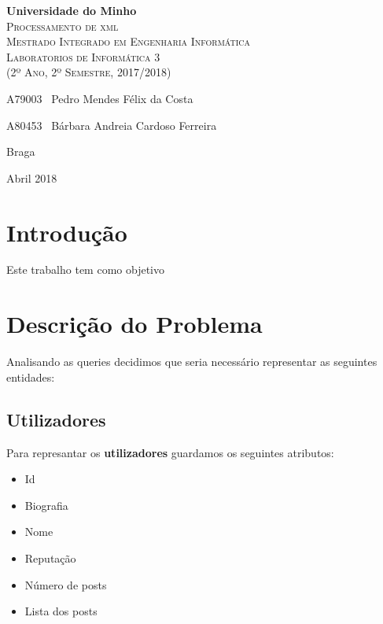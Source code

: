 \documentclass[10pt,a4paper]{report}
\begin{document}
\begin{titlepage}
    \center
    \vspace*{4.0cm}
    {\huge {\bf Universidade do Minho}}\\[0.4cm]
    \vspace{3.0cm}
    \textsc{\huge{Processamento de xml}}\\[0.5cm] %
    \vspace{3.0cm}
    \textsc{\huge{Mestrado Integrado em Engenharia Informática}}\\[0.5cm]
    \vspace{2.0cm}
    \textsc{Laboratorios de Informática 3}\\[0.5cm]
    \textsc{(2º Ano, 2º Semestre, 2017/2018)}\\[0.5cm]
    \vspace{1.5cm}
    \begin{flushleft}
        A79003 \,\,\,Pedro Mendes Félix da Costa
        \vspace{0.2cm}

        A80453 \,\,\,Bárbara Andreia Cardoso Ferreira
    \end{flushleft}
        \vspace{1cm}
    \begin{flushright}
        Braga

        Abril 2018
    \end{flushright}

\end{titlepage}

\tableofcontents

\chapter{Introdução}
    Este trabalho tem como objetivo 

\chapter{Descrição do Problema}
    Analisando as queries decidimos que seria necessário representar
    as seguintes entidades:

    \section{Utilizadores}
    Para represantar os \textbf{utilizadores} guardamos os seguintes atributos:
    \begin{itemize}
            \item Id
            \item Biografia
            \item Nome
            \item Reputação
            \item Número de posts
            \item Lista dos posts
    \end{itemize}
\end{document}
